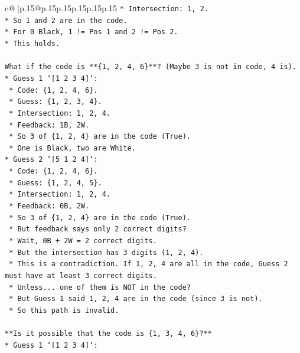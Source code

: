 \documentclass{article}
\begin{document}
{\begin{supertabular}{c@{$\;$}|p{.15\linewidth}@{}p{.15\linewidth}p{.15\linewidth}p{.15\linewidth}p{.15\linewidth}p{.15\linewidth}}
{{{\texttt{*   Intersection: 1, 2.} \\
\texttt{*   So 1 and 2 are in the code.} \\
\texttt{*   For 0 Black, 1 != Pos 1 and 2 != Pos 2.} \\
\texttt{*   This holds.} \\
\\ 
\texttt{What if the code is **\{1, 2, 4, 6\}**? (Maybe 3 is not in code, 4 is).} \\
\texttt{*   Guess 1 `{[}1 2 3 4{]}`:} \\
\texttt{    *   Code: \{1, 2, 4, 6\}.} \\
\texttt{    *   Guess: \{1, 2, 3, 4\}.} \\
\texttt{    *   Intersection: 1, 2, 4.} \\
\texttt{    *   Feedback: 1B, 2W.} \\
\texttt{    *   So 3 of \{1, 2, 4\} are in the code (True).} \\
\texttt{    *   One is Black, two are White.} \\
\texttt{*   Guess 2 `{[}5 1 2 4{]}`:} \\
\texttt{    *   Code: \{1, 2, 4, 6\}.} \\
\texttt{    *   Guess: \{1, 2, 4, 5\}.} \\
\texttt{    *   Intersection: 1, 2, 4.} \\
\texttt{    *   Feedback: 0B, 2W.} \\
\texttt{    *   So 3 of \{1, 2, 4\} are in the code (True).} \\
\texttt{    *   But feedback says only 2 correct digits?} \\
\texttt{    *   Wait, 0B + 2W = 2 correct digits.} \\
\texttt{    *   But the intersection has 3 digits (1, 2, 4).} \\
\texttt{    *   This is a contradiction. If 1, 2, 4 are all in the code, Guess 2 must have at least 3 correct digits.} \\
\texttt{    *   Unless... one of them is NOT in the code?} \\
\texttt{    *   But Guess 1 said 1, 2, 4 are in the code (since 3 is not).} \\
\texttt{    *   So this path is invalid.} \\
\\ 
\texttt{**Is it possible that the code is \{1, 3, 4, 6\}?**} \\
\texttt{*   Guess 1 `{[}1 2 3 4{]}`:} \\
}}}
\end{supertabular}}
\end{document}
